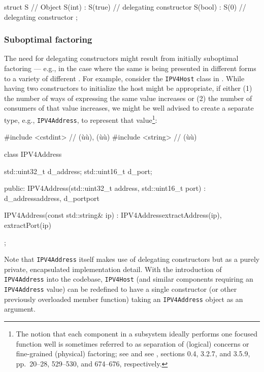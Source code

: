 \begin{emcppslisting}[emcppsignore={Intentionally Fails Everywhere}]
struct S  // Object
{
    S(int)  : S(true) { }  // delegating constructor
    S(bool) : S(0)    { }  // delegating constructor
};
\end{emcppslisting}

\subsubsection[Suboptimal factoring]{Suboptimal factoring}\label{suboptimal-factoring}

The need for delegating constructors might result from initially
suboptimal factoring --- e.g., in the case where the same 
is being presented in different forms to a variety of different
. For example, consider the \lstinline!IPV4Host! class
in . %
While having two constructors to
initialize the host might be appropriate, if either (1) the number of
ways of expressing the same value increases or (2) the number of
consumers of that value increases, we might be well advised to create a
separate  type, e.g., \lstinline!IPV4Address!, to
represent that value{\cprotect\footnote{The notion that each component
in a subsystem ideally performs one focused function well is sometimes
referred to as separation of (logical) concerns or
  fine-grained (physical) factoring; see \cite{dijkstra82} and see \cite{lakos20},
  sections 0.4, 3.2.7, and 3.5.9, pp.~20--28, 529--530, and 674--676,
  respectively.}}:

\begin{emcppslisting}[emcppsbatch=e4]
#include <cstdint>  // (ù{}ù), (ù{}ù)
#include <string>   // (ù{}ù)


class IPV4Address
{
    std::uint32_t d_address;
    std::uint16_t d_port;

public:
    IPV4Address(std::uint32_t address, std::uint16_t port)
        : d_address{address}, d_port{port}
    {
    }

    IPV4Address(const std::string& ip)
        : IPV4Address{extractAddress(ip), extractPort(ip)}
    {
    }
};
\end{emcppslisting}

\noindent Note that \lstinline!IPV4Address! itself makes use of delegating
constructors but as a purely private, encapsulated implementation
detail. With the introduction of \lstinline!IPV4Address! into the codebase,
\lstinline!IPV4Host! (and similar components requiring an
\lstinline!IPV4Address! value) can be redefined to have a single
constructor (or other previously overloaded member function) taking
an \lstinline!IPV4Address! object as an argument.

